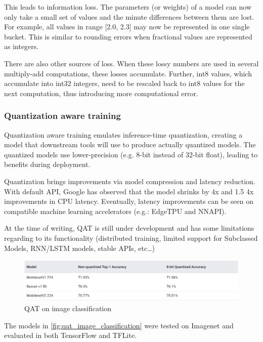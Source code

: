 This leads to information loss. The parameters (or weights) of a model can now
only take a small set of values and the minute differences between them are
lost. For example, all values in range [2.0, 2.3] may now be represented in one
single bucket. This is similar to rounding errors when fractional values are
represented as integers.

There are also other sources of loss. When these lossy numbers are used in
several multiply-add computations, these losses accumulate. Further, int8
values, which accumulate into int32 integers, need to be rescaled back to int8
values for the next computation, thus introducing more computational
error.~\cite{tfmot:quantization_blog}

\subsubsection{Quantization aware training}
Quantization aware training emulates inference-time quantization, creating a
model that downstream tools will use to produce actually quantized models. The
quantized models use lower-precision (e.g. 8-bit instead of 32-bit float),
leading to benefits during deployment.

Quantization brings improvements via model compression and latency reduction.
With default API, Google has observed that the model shrinks by 4x and 1.5 \-
4x improvements in CPU latency. Eventually, latency improvements can be seen on
compatible machine learning accelerators (e.g.: EdgeTPU and NNAPI).

At the time of writing, QAT is still under development and has some limitations
regarding to its functionality (distributed training, limited support for
Subclassed Models, RNN/LSTM models, stable APIs, etc\ldots)

\begin{figure}[ht]
    \includegraphics[width=\textwidth]{images/introduction/qat_image_classification.png}
    \centering
    \caption{QAT on image classification}\label{fig:qat_image_classification}
\end{figure}

The models in \autoref{fig:qat_image_classification} were tested on Imagenet
and evaluated in both TensorFlow and TFLite.

